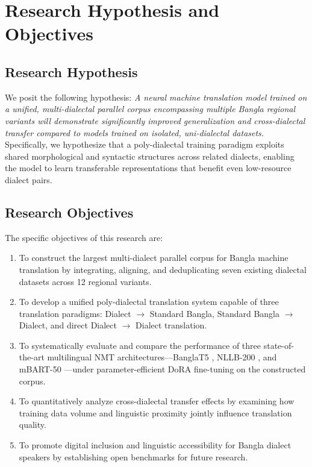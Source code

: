 \documentclass[12pt,a4paper]{article}
\begin{document}
\newpage

\section{Research Hypothesis and Objectives}

\subsection{Research Hypothesis}
We posit the following hypothesis: \textit{A neural machine translation model trained on a unified, multi-dialectal parallel corpus encompassing multiple Bangla regional variants will demonstrate significantly improved generalization and cross-dialectal transfer compared to models trained on isolated, uni-dialectal datasets.} Specifically, we hypothesize that a poly-dialectal training paradigm exploits shared morphological and syntactic structures across related dialects, enabling the model to learn transferable representations that benefit even low-resource dialect pairs.

\subsection{Research Objectives}
The specific objectives of this research are:
\begin{enumerate}
    \item To construct the largest multi-dialect parallel corpus for Bangla machine translation by integrating, aligning, and deduplicating seven existing dialectal datasets across 12 regional variants.
    \item To develop a unified poly-dialectal translation system capable of three translation paradigms: Dialect $\rightarrow$ Standard Bangla, Standard Bangla $\rightarrow$ Dialect, and direct Dialect $\rightarrow$ Dialect translation.
    \item To systematically evaluate and compare the performance of three state-of-the-art multilingual NMT architectures---BanglaT5 \cite{bhattacharjee-etal-2023-banglanlg}, NLLB-200 \cite{nllb2022}, and mBART-50 \cite{tang2020multilingual}---under parameter-efficient DoRA \cite{liu2024dora} fine-tuning on the constructed corpus.
    \item To quantitatively analyze cross-dialectal transfer effects by examining how training data volume and linguistic proximity jointly influence translation quality.
    \item To promote digital inclusion and linguistic accessibility for Bangla dialect speakers by establishing open benchmarks for future research.
\end{enumerate}
\end{document}
